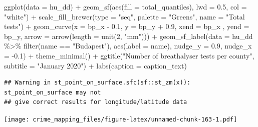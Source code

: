 \documentclass[
]{book}
\newenvironment{Shaded}{\begin{snugshade}}{\end{snugshade}}
\newcommand{\AttributeTok}[1]{\textcolor[rgb]{0.77,0.63,0.00}{#1}}
\newcommand{\DecValTok}[1]{\textcolor[rgb]{0.00,0.00,0.81}{#1}}
\newcommand{\FloatTok}[1]{\textcolor[rgb]{0.00,0.00,0.81}{#1}}
\newcommand{\FunctionTok}[1]{\textcolor[rgb]{0.00,0.00,0.00}{#1}}
\newcommand{\NormalTok}[1]{#1}
\newcommand{\SpecialCharTok}[1]{\textcolor[rgb]{0.00,0.00,0.00}{#1}}
\newcommand{\StringTok}[1]{\textcolor[rgb]{0.31,0.60,0.02}{#1}}
\begin{document}
\begin{Shaded}
\begin{Highlighting}[]
\FunctionTok{ggplot}\NormalTok{(}\AttributeTok{data =}\NormalTok{ hu\_dd) }\SpecialCharTok{+} 
  \FunctionTok{geom\_sf}\NormalTok{(}\FunctionTok{aes}\NormalTok{(}\AttributeTok{fill =}\NormalTok{ total\_quantiles), }\AttributeTok{lwd =} \FloatTok{0.5}\NormalTok{, }\AttributeTok{col =} \StringTok{"white"}\NormalTok{) }\SpecialCharTok{+} 
  \FunctionTok{scale\_fill\_brewer}\NormalTok{(}\AttributeTok{type =} \StringTok{"seq"}\NormalTok{, }\AttributeTok{palette =} \StringTok{"Greens"}\NormalTok{, }\AttributeTok{name =} \StringTok{"Total tests"}\NormalTok{) }\SpecialCharTok{+} 
  \FunctionTok{geom\_curve}\NormalTok{(}\AttributeTok{x =}\NormalTok{ bp\_x }\SpecialCharTok{{-}} \FloatTok{0.1}\NormalTok{, }
             \AttributeTok{y =}\NormalTok{ bp\_y }\SpecialCharTok{+} \FloatTok{0.9}\NormalTok{, }
             \AttributeTok{xend =}\NormalTok{ bp\_x , }
             \AttributeTok{yend =}\NormalTok{ bp\_y, }
             \AttributeTok{arrow =} \FunctionTok{arrow}\NormalTok{(}\AttributeTok{length =} \FunctionTok{unit}\NormalTok{(}\DecValTok{2}\NormalTok{, }\StringTok{"mm"}\NormalTok{))) }\SpecialCharTok{+}
  \FunctionTok{geom\_sf\_label}\NormalTok{(}\AttributeTok{data =}\NormalTok{ hu\_dd }\SpecialCharTok{\%\textgreater{}\%} \FunctionTok{filter}\NormalTok{(name }\SpecialCharTok{==} \StringTok{"Budapest"}\NormalTok{), }
                \FunctionTok{aes}\NormalTok{(}\AttributeTok{label =}\NormalTok{ name), }
                \AttributeTok{nudge\_y =} \FloatTok{0.9}\NormalTok{, }
                \AttributeTok{nudge\_x =} \SpecialCharTok{{-}}\FloatTok{0.1}\NormalTok{) }\SpecialCharTok{+} 
  \FunctionTok{theme\_minimal}\NormalTok{() }\SpecialCharTok{+} 
  \FunctionTok{ggtitle}\NormalTok{(}\StringTok{"Number of breathalyser tests per county"}\NormalTok{, }\AttributeTok{subtitle =} \StringTok{"January 2020"}\NormalTok{) }\SpecialCharTok{+} 
  \FunctionTok{labs}\NormalTok{(}\AttributeTok{caption =}\NormalTok{ caption\_text)}
\end{Highlighting}
\end{Shaded}

\begin{verbatim}
## Warning in st_point_on_surface.sfc(sf::st_zm(x)): st_point_on_surface may not
## give correct results for longitude/latitude data
\end{verbatim}

\texttt{[image: crime\_mapping\_files/figure-latex/unnamed-chunk-163-1.pdf]}
\end{document}
